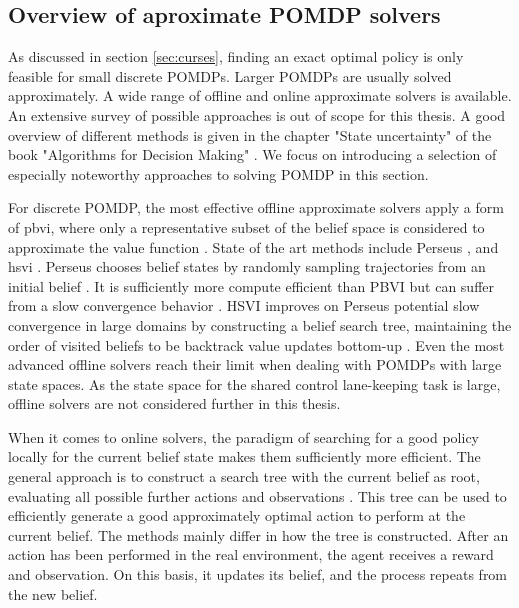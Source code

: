 \subsection{Overview of aproximate POMDP solvers}
\label{sec:solvers}

As discussed in section \ref{sec:curses}, finding an exact optimal policy is only feasible for small discrete POMDPs. Larger POMDPs are usually solved approximately. A wide range of offline and online approximate solvers is available. An extensive survey of possible approaches is out of scope for this thesis. A good overview of different methods is given in the chapter "State uncertainty" of the book "Algorithms for Decision Making" \parencite{decision_making_book}. We focus on introducing a selection of especially noteworthy approaches to solving POMDP in this section.

For discrete POMDP, the most effective offline approximate solvers apply a form of \gls{pbvi}, where only a representative subset of the belief space is considered to approximate the value function \parencite{pomdp-point-based-value}. State of the art methods include Perseus \parencite{pomdp_perseus}, and \gls{hsvi} \parencite{solver_hsvi}. Perseus chooses belief states by randomly sampling trajectories from an initial belief \parencite{pomdp_perseus}. It is sufficiently more compute efficient than PBVI but can suffer from a slow convergence behavior \parencite{pbvi-survey}. HSVI improves on Perseus potential slow convergence in large domains by constructing a belief search tree, maintaining the order of visited beliefs to be backtrack value updates bottom-up \parencite{solver_hsvi}. Even the most advanced offline solvers reach their limit when dealing with POMDPs with large state spaces. As the state space for the shared control lane-keeping task is large, offline solvers are not considered further in this thesis. 

When it comes to online solvers, the paradigm of searching for a good policy locally for the current belief state makes them sufficiently more efficient. The general approach is to construct a search tree with the current belief as root, evaluating all possible further actions and observations \parencite{decision_making_book}. This tree can be used to efficiently generate a good approximately optimal action to perform at the current belief. The methods mainly differ in how the tree is constructed. After an action has been performed in the real environment, the agent receives a reward and observation. On this basis, it updates its belief, and the process repeats from the new belief. 

